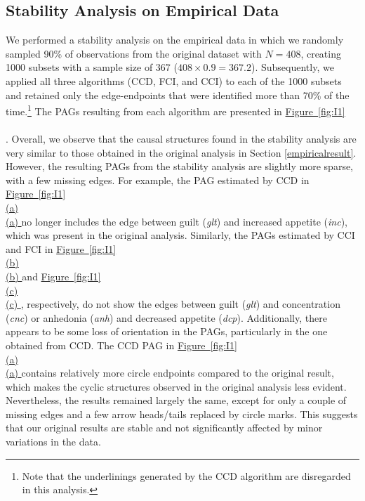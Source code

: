 \documentclass[twoside, 11pt]{article}
\newcommand*{\figref}[2][]{%
  \hyperref[{fig:#2}]{%
    Figure~\ref*{fig:#2}%
    \ifx\\#1\\%
    \else
      #1%
    \fi
  }%
}
\begin{document}
\begin{appendices}
\section{Stability Analysis on Empirical Data}\label{stability}
We performed a stability analysis on the empirical data in which we randomly sampled 90\% of observations from the original dataset with $N = 408$, creating 1000 subsets with a sample size of 367 ($408 \times 0.9 = 367.2$). Subsequently, we applied all three algorithms (CCD, FCI, and CCI) to each of the 1000 subsets and retained only the edge-endpoints that were identified more than 70\% of the time.\footnote{Note that the underlinings generated by the CCD algorithm are disregarded in this analysis.} The PAGs resulting from each algorithm are presented in \figref[]{I1}. 
Overall, we observe that the causal structures found in the stability analysis are very similar to those obtained in the original analysis in Section \ref{empiricalresult}. However, the resulting PAGs from the stability analysis are slightly more sparse, with a few missing edges. For example, the PAG estimated by CCD in \figref[(a)]{I1} no longer includes the edge between guilt (\textit{glt}) and increased appetite (\textit{inc}), which was present in the original analysis. Similarly, the PAGs estimated by CCI and FCI in \figref[(b)]{I1} and \figref[(c)]{I1}, respectively, do not show the edges between guilt (\textit{glt}) and concentration (\textit{cnc}) or anhedonia (\textit{anh}) and decreased appetite (\textit{dcp}). 
Additionally, there appears to be some loss of orientation in the PAGs, particularly in the one obtained from CCD. The CCD PAG in \figref[(a)]{I1} contains relatively more circle endpoints compared to the original result, which makes the cyclic structures observed in the original analysis less evident. 
Nevertheless, the results remained largely the same, except for only a couple of missing edges and a few arrow heads/tails replaced by circle marks. This suggests that our original results are stable and not significantly affected by minor variations in the data.


\end{appendices}
\end{document}
